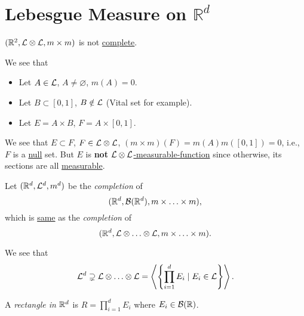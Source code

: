 \section{Lebesgue Measure on \(\mathbb{R} ^d\)}
\begin{eg}
	\((\mathbb{\MakeUppercase{r}} ^{2} , \mathcal{\MakeUppercase{l}} \otimes \mathcal{\MakeUppercase{l}}, m\times m)\) is not
	\hyperref[def:complete-measure-space]{complete}.
\end{eg}
\begin{explanation}
	We see that
	\begin{itemize}
		\item Let \(A\in \mathcal{\MakeUppercase{l}} \), \(A\neq \varnothing \), \(m(A) = 0\).
		\item Let \(B\subset [0, 1]\), \(B \notin \mathcal{\MakeUppercase{l}} \) (Vital set for example).
		\item Let \(E = A\times B\), \(F = A \times [0, 1]\).
	\end{itemize}
	We see that \(E\subset F\), \(F \in \mathcal{\MakeUppercase{l}} \otimes \mathcal{\MakeUppercase{l}} \), \((m\times m)(F)=m(A)m([0, 1]) = 0\), i.e.,
	\(F\) is a \hyperref[def:mu-null-set]{null} set. But \(E\) is \textbf{not}
	\hyperref[def:A-measurable-function]{\(\mathcal{\MakeUppercase{l}} \otimes \mathcal{\MakeUppercase{l}} \)-measurable-function} since otherwise,
	its sections are all \hyperref[def:A-measurable-function]{measurable}.
\end{explanation}
\begin{definition}
	Let \((\mathbb{\MakeUppercase{r}} ^d, \mathcal{\MakeUppercase{l}} ^d, m^d)\) be the \emph{completion} of
	\[
		(\mathbb{\MakeUppercase{r}} ^d, \mathcal{\MakeUppercase{b}} (\mathbb{\MakeUppercase{r}} ^d), m\times \ldots \times m ),
	\]
	which is \underline{same} as the \emph{completion} of
	\[
		(\mathbb{\MakeUppercase{r}} ^d, \mathcal{\MakeUppercase{l}} \otimes \ldots \otimes \mathcal{\MakeUppercase{l}}, m\times \ldots \times m).
	\]
\end{definition}

\begin{remark}
	We see that
	\[
		\mathcal{\MakeUppercase{l}} ^d \supsetneq \mathcal{\MakeUppercase{l}} \otimes \ldots \otimes \mathcal{\MakeUppercase{l}}
		= \left< \left\{ \prod\limits_{i=1}^{d}E_{i} \mid E_{i} \in \mathcal{\MakeUppercase{l}}  \right\} \right>.
	\]
\end{remark}

\begin{definition}\label{def:rectangle-in-Rd}
	A \emph{rectangle in \(\mathbb{\MakeUppercase{r}} ^d\)} is \(R = \prod\limits_{i=1}^{d} E_{i} \) where \(E_{i}\in \mathcal{\MakeUppercase{b}} (\mathbb{\MakeUppercase{r}} )\).
\end{definition}

